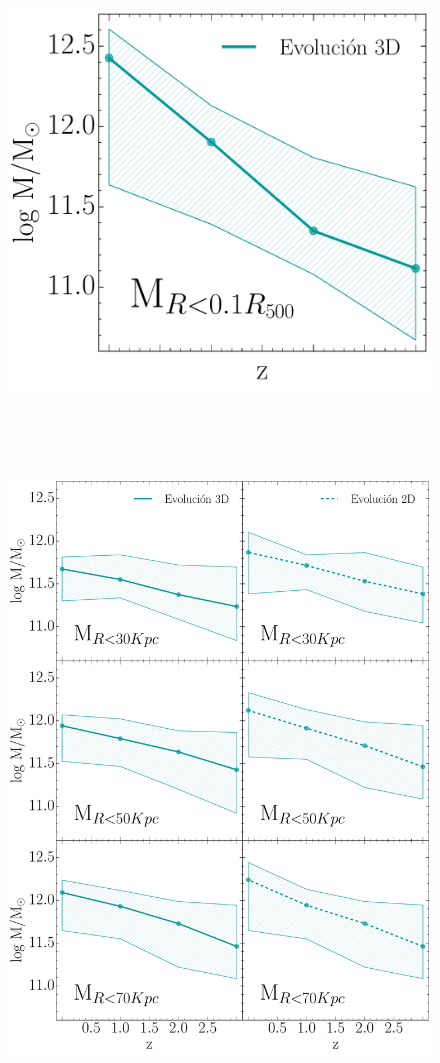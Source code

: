 \begin{figure}[H]
\centering
\includegraphics[height=12cm,width=12cm]{Figures/LR/evolucion_m10.pdf}
\caption[evom10]{}
\label{fig:evom10}
\end{figure}

\begin{figure}[H]
\centering
\includegraphics[height=17cm,width=12cm]{Figures/LR/evolucion.pdf}
\caption[evol]{}
\label{fig:evol}
\end{figure}


